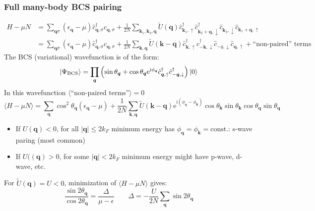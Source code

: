 \documentclass[11pt,letterpaper]{article}
\numberwithin{equation}{section} %
\renewcommand*{\vec}[1]{\bm{#1}}
\newcommand\mi{\mathrm{i}}
\newcommand\e{\mathrm{e}}
\newcommand{\spind}{\ensuremath{\downarrow}}
\newcommand{\spinu}{\ensuremath{\uparrow}}
\begin{document}
\subsubsection{Full many-body BCS pairing}
\label{ssub:Full many-body BCS pairing}
\begin{align}
	H-\mu N &= \sum_{\vec q \sigma} (\epsilon_{\vec q} - \mu)
	\hat c_{\vec q,\sigma}^\dagger \hat c_{\vec q, \sigma} + 
	\frac 1{2N} \sum_{\vec k_1, \vec k_2, \vec q} \tilde U(\vec q)
	\hat c_{\vec k_1,\spinu}^\dagger \hat c_{\vec k_2+\vec q,\spind}^\dagger
	\hat c_{\vec k_2,\spind} \hat c_{\vec k_1+\vec q, \spinu} \\
	&= \sum_{\vec q \sigma} (\epsilon_{\vec q} - \mu)
	\hat c_{\vec q,\sigma}^\dagger \hat c_{\vec q, \sigma} + 
	\frac 1{2N} \sum_{\vec k, \vec q} \tilde U(\vec k - \vec q)
	\hat c_{\vec k,\spinu}^\dagger \hat c_{-\vec k,\spind}^\dagger
	\hat c_{\vec -q,\spind} \hat c_{\vec q, \spinu}
	+\mbox{``non-paired'' terms}
\end{align}
The BCS (variational) wavefunction is of the form: 
\begin{equation}
	\ket{\Psi_{\mathrm{BCS}}} = \prod_{\vec q} \left( \sin\theta_{\vec q} + 
	\cos\theta_{\vec q}\e^{\mi\phi_{\vec q}} \hat c_{\vec q,\spinu}^\dagger
	\hat c_{-\vec q,\spind}^\dagger\right)\ket{0}
\end{equation}
In this wavefunction $\langle \mbox{``non-paired terms''}\rangle = 0$ 
\begin{equation}
	\langle H -\mu N\rangle = \sum_{\vec q}\cos^2\theta_{\vec q}
	(\epsilon_{\vec q} - \mu) + \frac 1{2N}\sum_{\vec k, \vec q} 
	\tilde U(\vec k - \vec q) \e^{\mi(\phi_{\vec q} - \phi_{\vec k})}
	\cos\theta_{\vec k}\sin\theta_{\vec k}\cos\theta_{\vec q}\sin\theta_{\vec q}
\end{equation}
\begin{itemize}
	\item If $U(\vec q)<0$, for all $|\vec q|\le 2k_F$ minimum energy has
		$\phi_{\vec q} = \phi_{\vec k} = \mbox{const.}$: s-wave paring
		(most common)
	\item If $U((\vec q)>0$, for some $|\vec q|<2k_F$ minimum energy might
		have p-wave, d-wave, etc. 
\end{itemize}
For $\tilde U(\vec q) = U<0$, minimization of $\langle H-\mu N\rangle$ gives:
\begin{equation}
	\frac{\sin 2\theta_{\vec q}}{\cos 2\theta_{\vec q}} =
	\frac{\Delta}{\mu-\epsilon} 
	\qquad 
	\Delta = -\frac{U}{2N}\sum_{\vec q}\sin 2\theta_{\vec q}
\end{equation}
\end{document}
